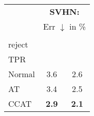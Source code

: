 \begin{tabularx}{1\textwidth}{|X|@{ }c@{ }|@{ }c@{ }|}
    \hline
    & \multicolumn{2}{c|}{\textbf{SVHN:}}\\
    & \multicolumn{2}{c|}{Err $\downarrow$ in \%}\\
    \hline
    \hline
    & \begin{tabular}{@{}c@{}}no\\reject\end{tabular} &
    \begin{tabular}{@{}c@{}}$99\%$\\TPR\end{tabular}\\
    \hline
    \hline
    Normal & 3.6 & 2.6\\
    AT & 3.4 & 2.5\\
    CCAT & \bfseries 2.9 & \bfseries 2.1\\
    \hline
\end{tabularx}